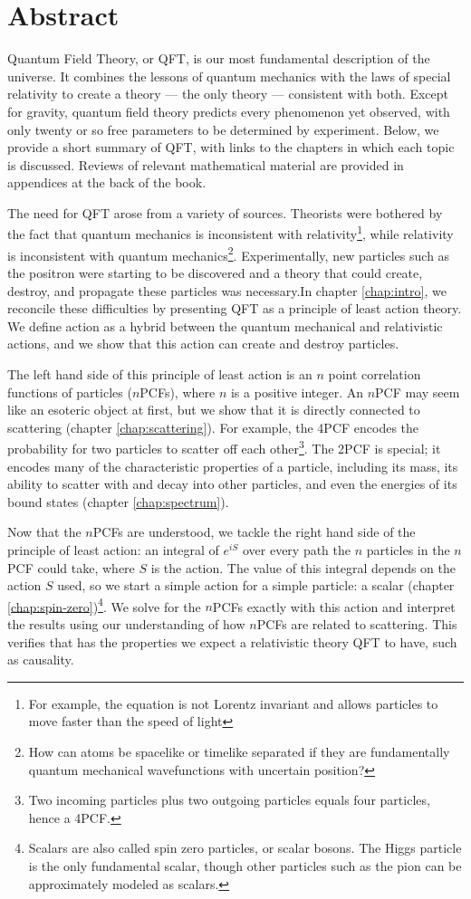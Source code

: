 \chapter{Abstract}

Quantum Field Theory, or QFT, is our most fundamental description of the universe. It combines the lessons of quantum mechanics with the laws of special relativity to create a theory --- the only theory --- consistent with both. Except for gravity, quantum field theory predicts every phenomenon yet observed, with only twenty or so free parameters to be determined by experiment. Below, we provide a short summary of QFT, with links to the chapters in which each topic is discussed. Reviews of relevant mathematical material are provided in appendices at the back of the book.

The need for QFT arose from a variety of sources. Theorists were bothered by the fact that quantum mechanics is inconsistent with relativity\footnote{For example, the \Schrodinger equation is not Lorentz invariant and allows particles to move faster than the speed of light}, while relativity is inconsistent with quantum mechanics\footnote{How can atoms be spacelike or timelike separated if they are fundamentally quantum mechanical wavefunctions with uncertain position?}. Experimentally, new particles such as the positron were starting to be discovered and a theory that could create, destroy, and propagate these particles was necessary.In chapter \ref{chap:intro}, we reconcile these difficulties by presenting QFT as a principle of least action theory. We define action as a hybrid between the quantum mechanical and relativistic actions, and we show that this action can create and destroy particles.

The left hand side of this principle of least action is an $n$ point correlation functions of particles ($n$PCFs), where $n$ is a positive integer. An $n$PCF may seem like an esoteric object at first, but we show that it is directly connected to scattering (chapter \ref{chap:scattering}). For example, the 4PCF encodes the probability for two particles to scatter off each other\footnote{Two incoming particles plus two outgoing particles equals four particles, hence a 4PCF.}. The 2PCF is special; it encodes many of the characteristic properties of a particle, including its mass, its ability to scatter with and decay into other particles, and even the energies of its bound states (chapter \ref{chap:spectrum}).

Now that the $n$PCFs are understood, we tackle the right hand side of the principle of least action: an integral of $e^{iS}$ over every path the $n$ particles in the $n$PCF could take, where $S$ is the action. The value of this integral depends on the action $S$ used, so we start a simple action for a simple particle: a scalar (chapter \ref{chap:spin-zero})\footnote{Scalars are also called spin zero particles, or scalar bosons. The Higgs particle is the only fundamental scalar, though other particles such as the pion can be approximately modeled as scalars.}. We solve for the $n$PCFs exactly with this action and interpret the results using our understanding of how $n$PCFs are related to scattering. This verifies that has the properties we expect a relativistic theory QFT to have, such as causality.

